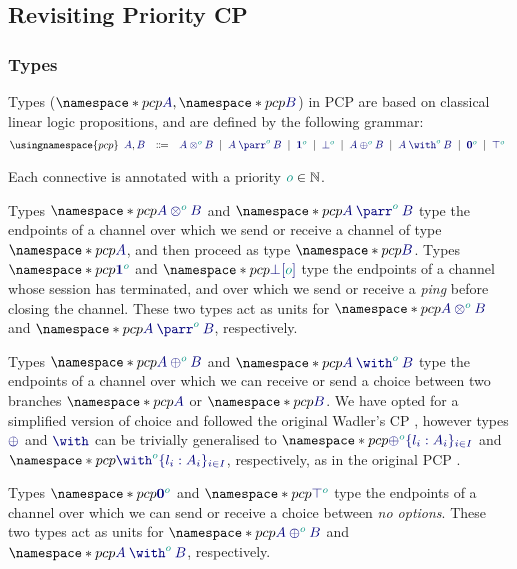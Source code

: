 \begingroup
{}
\subsection{Revisiting Priority CP}
\label{app:revisiting-PCP}

\subsubsection*{Types}
Types ($\pcp{\ty{A}}, \pcp{\ty{B}}$) in PCP are based on classical linear logic propositions, and are defined by the following grammar:
\[
  \usingnamespace{pcp}
  \begin{array}{lcl}
    \ty{A}, \ty{B}
    & \Coloneqq & \ty{\tytens[\cs{o}]{A}{B}}
      \sep        \ty{\typarr[\cs{o}]{A}{B}}
      \sep        \ty{\tyone[\cs{o}]}
      \sep        \ty{\tybot[\cs{o}]}
      \sep        \ty{\typlus[\cs{o}]{A}{B}}
      \sep        \ty{\tywith[\cs{o}]{A}{B}}
      \sep        \ty{\tynil[\cs{o}]}
      \sep        \ty{\tytop[\cs{o}]}
  \end{array}
\]

Each connective is annotated with a priority $\cs{o}\in\mathbb{N}$.

Types $\pcp{\ty{\tytens[\cs{o}]{A}{B}}}$ and $\pcp{\ty{\typarr[\cs{o}]{A}{B}}}$ type the endpoints of a channel over which we send or receive a channel of type $\pcp{\ty{A}}$, and then proceed as type $\pcp{\ty{B}}$. Types $\pcp{\ty{\tyone[\cs{o}]}}$ and $\pcp{\ty{{\tybot}[\cs{o}]}}$ type the endpoints of a channel whose session has terminated, and over which we send or receive a \emph{ping} before closing the channel. These two types act as units for $\pcp{\ty{\tytens[\cs{o}]{A}{B}}}$ and $\pcp{\ty{\typarr[\cs{o}]{A}{B}}}$, respectively.

Types $\pcp{\ty{\typlus[\cs{o}]{A}{B}}}$ and $\pcp{\ty{\tywith[\cs{o}]{A}{B}}}$ type the endpoints of a channel over which we can receive or send a choice between two branches $\pcp{\ty{A}}$ or $\pcp{\ty{B}}$. We have opted for a simplified version of choice and followed the original Wadler's CP \cite{wadler14}, however types $\ty{\oplus}$ and $\ty{\with}$ can be trivially generalised to $\pcp{\ty{\oplus^{\cs{o}}\{l_i:A_i\}_{i\in I}}}$ and $\pcp{\ty{\with^{\cs{o}}\{l_i:A_i\}_{i\in I}}}$, respectively, as in the original PCP \cite{dardhagay18extended}.

Types $\pcp{\ty{\tynil[\cs{o}]}}$ and $\pcp{\ty{\tytop[\cs{o}]}}$ type the endpoints of a channel over which we can send or receive a choice between \emph{no options}. These two types act as units for $\pcp{\ty{\typlus[\cs{o}]{A}{B}}}$ and $\pcp{\ty{\tywith[\cs{o}]{A}{B}}}$, respectively.

